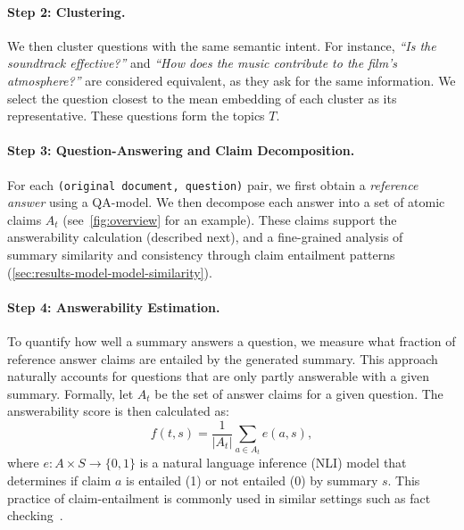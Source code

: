 \paragraph{Step 2: Clustering.}
We then cluster questions with the same semantic intent.
For instance, \emph{``Is the soundtrack effective?''} and \emph{``How does the music contribute to the film's atmosphere?''} are considered equivalent, as they ask for the same information. We select the question closest to the mean embedding of each cluster as its representative. These questions form the topics $T$.

\paragraph{Step 3: Question-Answering and Claim Decomposition.}
For each \texttt{\small (original document, question)} pair, we first obtain a \emph{reference answer} using a QA-model.
We then decompose each answer into a set of atomic claims $A_t$ (see~\cref{fig:overview} for an example).
These claims support the answerability calculation (described next), and a fine-grained analysis of summary similarity and consistency through claim entailment patterns (\cref{sec:results-model-model-similarity}).

\paragraph{Step 4: Answerability Estimation.}
To quantify how well a summary answers a question, we measure what fraction of reference answer claims are entailed by the generated summary.
This approach naturally accounts for questions that are only partly answerable with a given summary.
Formally, let $A_t$ be the set of answer claims for a given question.
The answerability score is then calculated as:
%
\begin{equation}\label{eqn:answerability}
f(t,s) = \frac{1}{|A_t|} \sum\limits_{a \in A_t} e(a, s),
\end{equation}
%
where $e: A \times S \rightarrow \{0,1\}$ is a natural language inference (NLI) model that determines if claim $a$ is entailed (1) or not entailed (0) by summary $s$.
This practice of claim-entailment is commonly used in similar settings such as fact checking~\cite{Kamoi:2023:EMNLP,Min:2023:EMNLP,Stacey:2024:EMNLP}.

